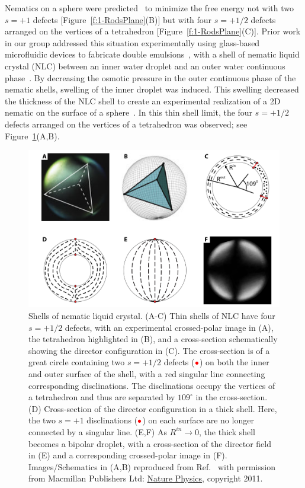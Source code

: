 Nematics on a sphere were predicted~\cite{RN42,RN104,RN43} to minimize the free energy not with two $s=+1$ defects [Figure~\ref{f:1-RodsPlane}(B)] but with four $s=+1/2$ defects arranged on the vertices of a tetrahedron [Figure~\ref{f:1-RodsPlane}(C)].
Prior work in our group addressed this situation experimentally using glass-based microfluidic devices to fabricate double emulsions~\cite{RN272}, with a shell of nematic liquid crystal (NLC) between an inner water droplet and an outer water continuous phase~\cite{RN105,RN45}.
By decreasing the osmotic pressure in the outer continuous phase of the nematic shells, swelling of the inner droplet was induced.
This swelling decreased the thickness of the NLC shell to create an experimental realization of a 2D nematic on the surface of a sphere~\cite{RN45}.
In this thin shell limit, the four $s = +1/2$ defects arranged on the vertices of a tetrahedron was observed; see Figure~\ref{f:1-Shells}(A,B).
\begin{figure}
  \centering
  \includegraphics{figures/C1/Ch1-Figs_Shells.png}
  \caption{Shells of nematic liquid crystal.
  (A-C) Thin shells of NLC have four $s = +1/2$ defects, with an experimental crossed-polar image in (A), the tetrahedron highlighted in (B), and a cross-section schematically showing the director configuration in (C).
  The cross-section is of a great circle containing two $s = +1/2$ defects (${\color{red} \bullet}$) on both the inner and outer surface of the shell, with a red singular line connecting corresponding disclinations.
  The disclinations occupy the vertices of a tetrahedron and thus are separated by $109^{\circ}$ in the cross-section.
  (D) Cross-section of the director configuration in a thick shell. Here, the two $s = +1$ disclinations (${\color{red} \bullet}$) on each surface are no longer connected by a singular line.
  (E,F) As $R^{in}\rightarrow 0$, the thick shell becomes a bipolar droplet, with a cross-section of the director field in (E) and a corresponding crossed-polar image in (F).
  Images/Schematics in (A,B) reproduced from Ref.~\cite{RN105} with permission from Macmillan Publishers Ltd: \href{https://www.nature.com/nphys/}{Nature Physics}, copyright 2011.}\label{f:1-Shells}
\end{figure}

